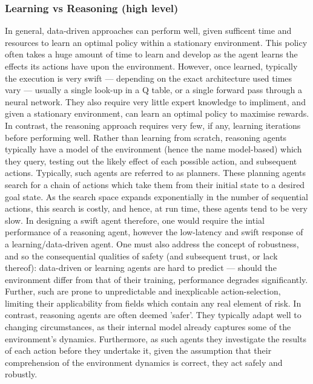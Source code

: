 \subsubsection{Learning vs Reasoning (high level)}
 
In general, data-driven approaches can perform well, given sufficent time and resources to learn an optimal policy within a stationary environment. This policy often takes a huge amount of time to learn and develop as the agent learns the effects its actions have upon the environment. However, once learned, typically the execution is very swift --- depending on the exact architecture used times vary --- usually a single look-up in a Q table, or a single forward pass through a neural network. They also require very little expert knowledge to impliment, and given a stationary environment, can learn an optimal policy to maximise rewards. 
\newline \newline
In contrast, the reasoning approach requires very few, if any, learning iterations before performing well. Rather than learning from scratch, reasoning agents typically have a model of the environment (hence the name model-based) which they query, testing out the likely effect of each possible action, and subsequent actions. Typically, such agents are referred to as planners. These planning agents search for a chain of actions which take them from their initial state to a desired goal state. As the search space expands exponentially in the number of sequential actions, this search is costly, and hence, at run time, these agents tend to be very slow. 
\newline\newline
In designing a swift agent therefore, one would require the intial performance of a reasoning agent, however the low-latency and swift response of a learning/data-driven agent. 
\newline \newline
One must also address the concept of robustness, and so the consequential qualities of safety (and subsequent trust, or lack thereof): data-driven or learning agents are hard to predict --- should the environment differ from that of their training, performance degrades significantly. 
Further, such are prone to unpredictable and inexplicable action-selection, limiting their applicability from fields which contain any real element of risk. In contrast, reasoning agents are often deemed 'safer'. 
They typically adapt well to changing circumstances, as their internal model already captures some of the environment's dynamics. 
Furthermore, as such agents they investigate the results of each action before they undertake it, given the assumption that their comprehension of the environment dynamics is correct, they act safely and robustly.


